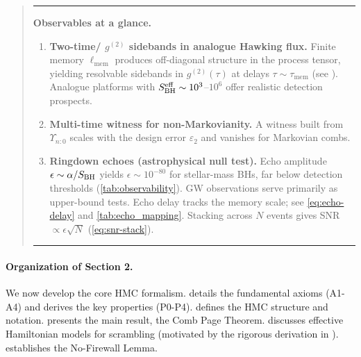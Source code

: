 \documentclass[a4paper,11pt]{article}
\newcommand{\HMC}{\textup{\textsc{HMC}}\xspace}
\newenvironment{infobox}{%
  \par\smallskip\begin{quote}\noindent\hrule\smallskip
}{%
  \smallskip\hrule\end{quote}\smallskip
}
\newenvironment{boxedresult}[1]{\begin{infobox}\noindent\textbf{#1.}}{\end{infobox}}
\newcommand{\ellmem}{\ensuremath{\ell_{\mathrm{mem}}}}
\newcommand{\taumem}{\ensuremath{\tau_{\mathrm{mem}}}}
\theoremstyle{plain}
\theoremstyle{definition}
\theoremstyle{remark}
\begin{document}
\begin{boxedresult}{Observables at a glance}
\begin{enumerate}[leftmargin=*]
\item \textbf{Two-time/ \(g^{(2)}\) sidebands in analogue Hawking flux.} Finite memory \(\ellmem\) produces off-diagonal structure in the process tensor, yielding resolvable sidebands in \(g^{(2)}(\tau)\) at delays \(\tau\sim \taumem\) (see ). Analogue platforms with $S_{\rm BH}^{\rm eff}\sim 10^3$--$10^6$ offer realistic detection prospects.
\item \textbf{Multi-time witness for non-Markovianity.} A witness built from \(\Upsilon_{n{:}0}\) scales with the design error \(\varepsilon_2\) and vanishes for Markovian combs.
\item \textbf{Ringdown echoes (astrophysical null test).} Echo amplitude $\epsilon\sim \alpha/S_{\rm BH}$ yields $\epsilon\sim 10^{-80}$ for stellar-mass BHs, far below detection thresholds (\cref{tab:observability}). GW observations serve primarily as upper-bound tests. Echo delay tracks the memory scale; see \eqref{eq:echo-delay} and \cref{tab:echo_mapping}. Stacking across \(N\) events gives SNR \(\propto \epsilon \sqrt{N}\) (\eqref{eq:snr-stack}).
\end{enumerate}
\end{boxedresult}

\paragraph{Organization of Section 2.}
We now develop the core \HMC{} formalism.
 details the fundamental axioms (A1-A4) and derives the key properties (P0-P4).
 defines the \HMC{} structure and notation.
 presents the main result, the Comb Page Theorem.
 discusses effective Hamiltonian models for scrambling (motivated by the rigorous derivation in ).
 establishes the No-Firewall Lemma.
\end{document}
